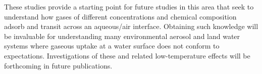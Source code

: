\documentclass{article}
\begin{document}
These studies provide a starting point for future studies in this area that seek to understand how gases of different concentrations and chemical composition adsorb and transit across an aqueous/air interface. Obtaining such knowledge will be invaluable for understanding many environmental aerosol and land water systems where gaseous uptake at a water surface does not conform to expectations.\cite{Jayne1990,Yang2002,Worsnop1989,Boniface2000} Investigations of these and related low-temperature effects will be forthcoming in future publications.




\end{document}
